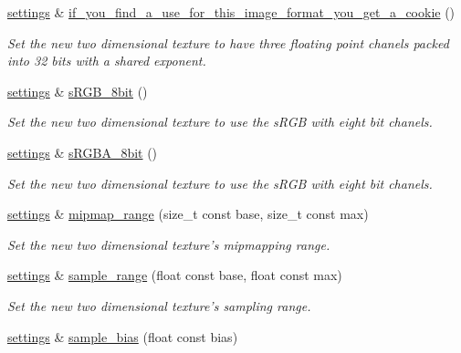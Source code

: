 \begin{DoxyCompactItemize}
\hyperlink{classgfx_1_1texture__2D_1_1settings}{settings} \& \hyperlink{classgfx_1_1texture__2D_1_1settings_a3394f46fd2d45a46c467b692c5cc6b1e}{if\-\_\-you\-\_\-find\-\_\-a\-\_\-use\-\_\-for\-\_\-this\-\_\-image\-\_\-format\-\_\-you\-\_\-get\-\_\-a\-\_\-cookie} ()
\begin{DoxyCompactList}\small\item\em Set the new two dimensional texture to have three floating point chanels packed into 32 bits with a shared exponent. \end{DoxyCompactList}\item 
\hyperlink{classgfx_1_1texture__2D_1_1settings}{settings} \& \hyperlink{classgfx_1_1texture__2D_1_1settings_a75042136e24d8cd820c239e4ae10d4c9}{s\-R\-G\-B\-\_\-8bit} ()
\begin{DoxyCompactList}\small\item\em Set the new two dimensional texture to use the s\-R\-G\-B with eight bit chanels. \end{DoxyCompactList}\item 
\hyperlink{classgfx_1_1texture__2D_1_1settings}{settings} \& \hyperlink{classgfx_1_1texture__2D_1_1settings_a94e3c3cea208f94bdb686dcd5c13f3b9}{s\-R\-G\-B\-A\-\_\-8bit} ()
\begin{DoxyCompactList}\small\item\em Set the new two dimensional texture to use the s\-R\-G\-B with eight bit chanels. \end{DoxyCompactList}\item 
\hyperlink{classgfx_1_1texture__2D_1_1settings}{settings} \& \hyperlink{classgfx_1_1texture__2D_1_1settings_addc3d9e5e345abe019e7ba46f2dfce64}{mipmap\-\_\-range} (size\-\_\-t const base, size\-\_\-t const max)
\begin{DoxyCompactList}\small\item\em Set the new two dimensional texture's mipmapping range. \end{DoxyCompactList}\item 
\hyperlink{classgfx_1_1texture__2D_1_1settings}{settings} \& \hyperlink{classgfx_1_1texture__2D_1_1settings_a58421d3fd719f6affed7e9a0304118e0}{sample\-\_\-range} (float const base, float const max)
\begin{DoxyCompactList}\small\item\em Set the new two dimensional texture's sampling range. \end{DoxyCompactList}\item 
\hyperlink{classgfx_1_1texture__2D_1_1settings}{settings} \& \hyperlink{classgfx_1_1texture__2D_1_1settings_af5578fe66c5982e519e40fd3f6844948}{sample\-\_\-bias} (float const bias)

\end{DoxyCompactItemize}
